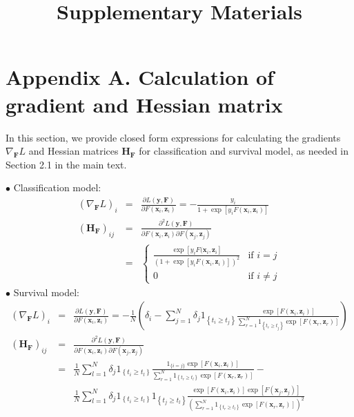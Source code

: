 \documentclass[a4paper,12pt]{article}
\title{
	\vspace{4in}
	\textmd{\bf Supplementary Materials}\\
	\vspace{3in}
}
\date{}
\newcommand{\bd}[1]{\mathbf{#1}}
\newcommand{\grad}[2]{\nabla_{\bd{#2}} #1}
\newcommand{\hess}[1]{\bd{H}_{\bd{#1}}}
\begin{document}
	\maketitle
	\thispagestyle{empty}
	\newpage
	\setcounter{page}{1}
	\section*{Appendix A. Calculation of gradient and Hessian matrix} \label{sec:calcu}
	In this section, we provide closed form expressions for calculating the gradients $\grad{L}{F}$ and Hessian matrices $\hess{F}$ for classification and survival model, as needed in Section 2.1 in the main text.
	
	\noindent $\bullet$ Classification model:
	\begin{eqnarray*}
		(\grad{L}{F})_i & = & \frac{\partial L(\bd{y}, \bd{F})}{\partial F(\bd{x}_i, \bd{z}_i)} = -\frac{y_i}{1+\exp[y_i F(\bd{x}_i, \bd{z}_i)]} \\
		(\hess{F})_{ij} & = & \frac{\partial^2 L(\bd{y}, \bd{F})}{\partial F(\bd{x}_i, \bd{z}_i) \partial F(\bd{x}_j, \bd{z}_j)} \\
		& = & \begin{cases}
			\frac{\exp[y_iF(\bd{x}_i, \bd{z}_i]}{(1+\exp[y_iF(\bd{x}_i, \bd{z}_i)])^2} &\text{if  $i = j$}\\
			0 &\text{if $i \neq j$}
		\end{cases}
	\end{eqnarray*}
	\noindent $\bullet$ Survival model:
	\begin{eqnarray*}
		(\grad{L}{F})_i &=&   \frac{\partial L(\bd{y}, \bd{F})}{\partial F(\bd{x}_i, \bd{z}_i)}  = -\frac{1}{N}\left( \delta_i - \sum^N_{j=1}\delta_j1_{\left\lbrace t_i \geq t_j\right\rbrace }\frac{\exp[F(\bd{x}_i, \bd{z}_i)]}{\sum^N_{r=1}1_{\left\lbrace t_r \geq t_j \right\rbrace }\exp[F(\bd{x}_r, \bd{z}_r)]}\right) \\
		(\hess{F})_{ij} & = & \frac{\partial^2 L(\bd{y}, \bd{F})}{\partial F(\bd{x}_i, \bd{z}_i) \partial F(\bd{x}_j, \bd{z}_j)} \\
		& = &  \frac{1}{N} \sum^N_{l=1}\delta_j 1_{\left\lbrace t_i \geq t_l\right\rbrace }  \frac{1_{\{ i = j\}}\exp[F(\bd{x}_i, \bd{z}_i)]}{ \sum^N_{r=1}1_{\left\lbrace t_r \geq t_l \right\rbrace }\exp[F(\bd{x}_r, \bd{z}_r)]} - \\
		& & \frac{1}{N} \sum^N_{l=1}\delta_j 1_{\left\lbrace t_i \geq t_l\right\rbrace } 1_{\left\lbrace t_j \geq t_l \right\rbrace }\frac{\exp[F(\bd{x}_i, \bd{z}_i)]\exp[F(\bd{x}_j, \bd{z}_j)]}{\left( \sum^N_{r=1}1_{\left\lbrace t_r \geq t_l \right\rbrace }\exp[F(\bd{x}_r, \bd{z}_r)]\right) ^2} 
	\end{eqnarray*}
	
\end{document}
